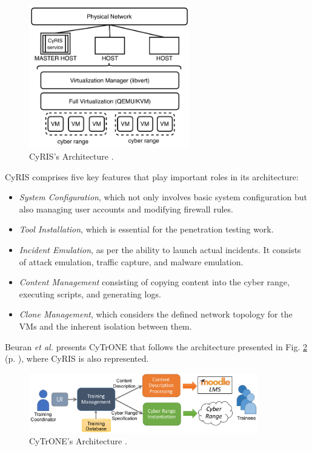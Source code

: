 \begin{figure}[H]
    \includegraphics[width=7cm]{figures/cyris_architecture.png}
    \caption{CyRIS's Architecture \cite{cyris_ref}.}
    \label{fig:cyris_architecture}
\end{figure}

CyRIS comprises five key features that play important roles in its architecture:

\begin{itemize}
    \item \textit{System Configuration}, which not only involves basic system configuration but also managing user accounts and modifying firewall rules.
    \item \textit{Tool Installation}, which is essential for the penetration testing work.
    \item \textit{Incident Emulation}, as per the ability to launch actual incidents. It consists of attack emulation, traffic capture, and malware emulation.
    \item \textit{Content Management} consisting of copying content into the cyber range, executing scripts, and generating logs.
    \item \textit{Clone Management}, which considers the defined network topology for the VMs and the inherent isolation between them.
\end{itemize}

Beuran \textit{et al.} \cite{cytrone_ref} presents CyTrONE that follows the architecture presented in Fig. \ref{fig:cytrone_architecture} (p. \pageref{fig:cytrone_architecture}), where CyRIS is also represented.

\begin{figure}[H]
    \includegraphics[width=10cm]{figures/cytrone_architecture.png}
    \caption{CyTrONE's Architecture \cite{cytrone_ref}.}
    \label{fig:cytrone_architecture}
\end{figure}

